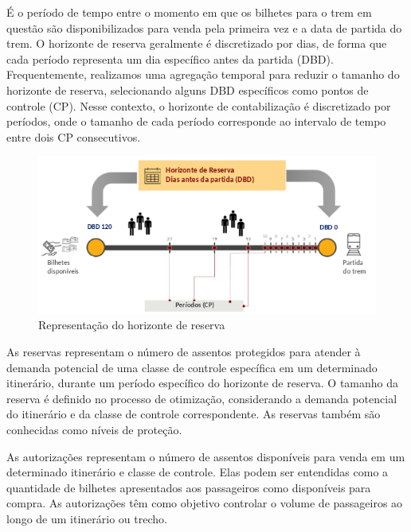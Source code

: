 \begin{description}[style=unboxed, leftmargin=0cm]
	\item[Horizonte de reserva:] É o período de tempo entre o momento em que os bilhetes para o trem em questão são disponibilizados para venda pela primeira vez e a data de partida do trem. O horizonte de reserva geralmente é discretizado por dias, de forma que cada período representa um dia específico antes da partida (DBD). Frequentemente, realizamos uma agregação temporal para reduzir o tamanho do horizonte de reserva, selecionando alguns DBD específicos como pontos de controle (CP). Nesse contexto, o horizonte de contabilização é discretizado por períodos, onde o tamanho de cada período corresponde ao intervalo de tempo entre dois CP consecutivos.

	      \begin{figure}[H]
		      \begin{center}
			      \includegraphics[scale=0.53]{img/h_reserva.png}
			      \caption{Representação do horizonte de reserva}
			      \label{fig: h_reserva}
		      \end{center}
	      \end{figure}
	      \vspace{-1cm}

	\item[Reservas:] As reservas representam o número de assentos protegidos para atender à demanda potencial de uma classe de controle específica em um determinado itinerário, durante um período específico do horizonte de reserva. O tamanho da reserva é definido no processo de otimização, considerando a demanda potencial do itinerário e da classe de controle correspondente. As reservas também são conhecidas como níveis de proteção.

	\item[Autorizações:] As autorizações representam o número de assentos disponíveis para venda em um determinado itinerário e classe de controle. Elas podem ser entendidas como a quantidade de bilhetes apresentados aos passageiros como disponíveis para compra. As autorizações têm como objetivo controlar o volume de passageiros ao longo de um itinerário ou trecho.


\end{description}
